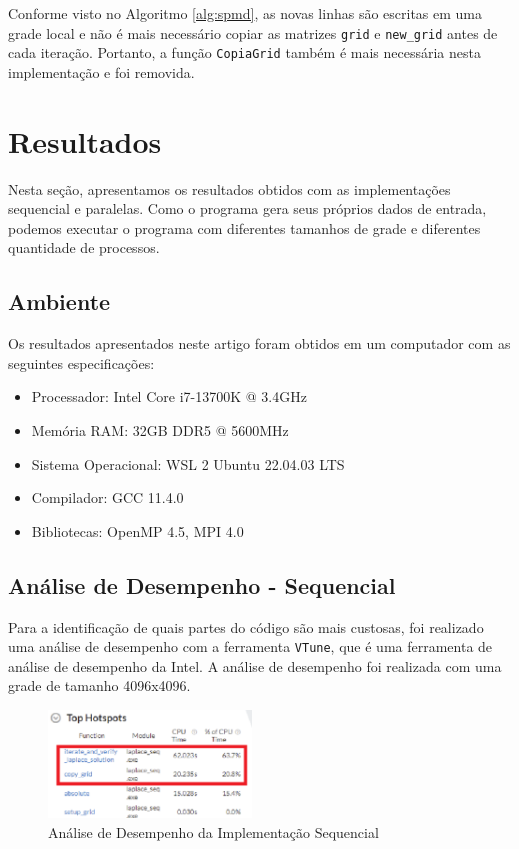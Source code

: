 \documentclass[conference]{IEEEtran}
\begin{document}
Conforme visto no Algoritmo \ref{alg:spmd}, as novas linhas são escritas em uma grade local e não é mais necessário copiar as matrizes \texttt{grid} e \texttt{new\_grid} antes de cada iteração. Portanto, a função \texttt{CopiaGrid} também é mais necessária nesta implementação e foi removida.

\section{Resultados}

Nesta seção, apresentamos os resultados obtidos com as implementações sequencial e paralelas. Como o programa gera seus próprios dados de entrada, podemos executar o programa com diferentes tamanhos de grade e diferentes quantidade de processos.

\subsection{Ambiente}

Os resultados apresentados neste artigo foram obtidos em um computador com as seguintes especificações:

\begin{itemize}
    \item Processador: Intel Core i7-13700K @ 3.4GHz
    \item Memória RAM: 32GB DDR5 @ 5600MHz
    \item Sistema Operacional: WSL 2 Ubuntu 22.04.03 LTS
    \item Compilador: GCC 11.4.0
    \item Bibliotecas: OpenMP 4.5, MPI 4.0
\end{itemize}

\subsection{Análise de Desempenho - Sequencial}

Para a identificação de quais partes do código são mais custosas, foi realizado uma análise de desempenho com a ferramenta \texttt{VTune}, que é uma ferramenta de análise de desempenho da Intel. A análise de desempenho foi realizada com uma grade de tamanho 4096x4096.

\begin{figure}[H]
    \centering
    \includegraphics[width=0.48\textwidth]{images/seq_og_vtune.png}
    \caption{Análise de Desempenho da Implementação Sequencial}
    \label{fig:seq_og_vtune}
\end{figure}
\end{document}
